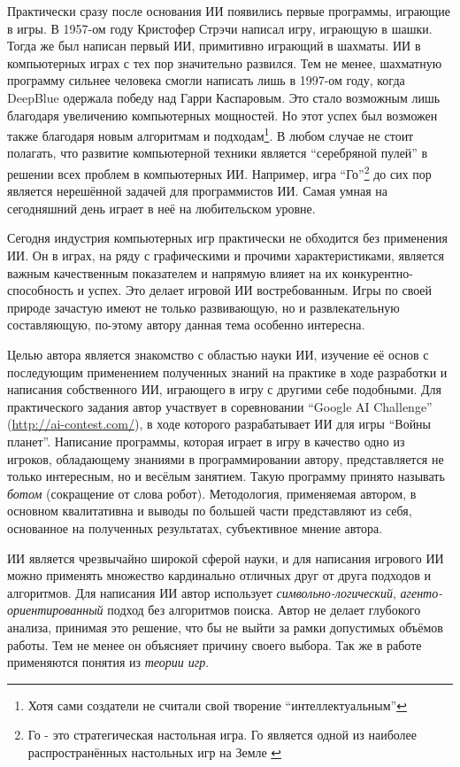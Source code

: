 \documentclass[12pt]{report}
\begin{document}
Практически сразу после основания ИИ появились первые программы, играющие в игры. В 1957-ом году Кристофер Стрэчи написал игру, играющую в шашки. Тогда же был написан первый ИИ, примитивно играющий в шахматы. \citep{russell1995} ИИ в компьютерных играх с тех пор значительно развился. Тем не менее, шахматную программу сильнее человека смогли написать лишь в 1997-ом году, когда DeepBlue одержала победу над Гарри Каспаровым. Это стало возможным лишь благодаря увеличению компьютерных мощностей. Но этот успех был возможен также благодаря новым алгоритмам и подходам\footnote{Хотя сами создатели не считали свой творение ``интеллектуальным''\cite{moravec1998will}}. В любом случае не стоит полагать, что развитие компьютерной техники является ``серебряной пулей'' в решении всех проблем в компьютерных ИИ. Например, игра ``Го''\footnote{Го - это стратегическая настольная игра. Го является одной из наиболее распространённых настольных игр на Земле \cite{GoGameWiki}} до сих пор является нерешённой задачей для программистов ИИ. Самая умная на сегодняшний день играет в неё на любительском уровне. \citep{russell1995}

Сегодня индустрия компьютерных игр практически не обходится без применения ИИ. Он в играх, на ряду с графическими и прочими характеристиками, является важным качественным показателем и напрямую влияет на их конкурентно-способность и успех. Это делает игровой ИИ востребованным. Игры по своей природе зачастую имеют не только развивающую, но и развлекательную составляющую, по-этому автору данная тема особенно интересна.

Целью автора является знакомство с областью науки ИИ, изучение её основ с последующим применением полученных знаний на практике в ходе разработки и написания собственного ИИ, играющего в игру с другими себе подобными. Для практического задания автор участвует в соревновании ``Google AI Challenge'' (\url{http://ai-contest.com/}), в ходе которого разрабатывает ИИ для игры ``Войны планет''. Написание программы, которая играет в игру в качество одно из игроков, обладающему знаниями в программировании автору, представляется не только интересным, но и весёлым занятием. Такую программу принято называть \emph{ботом} (сокращение от слова робот). Методология, применяемая автором, в основном квалитативна и выводы по большей части представляют из себя, основанное на полученных результатах, субъективное мнение автора.

ИИ является чрезвычайно широкой сферой науки, и для написания игрового ИИ можно применять множество кардинально отличных друг от друга подходов и алгоритмов. Для написания ИИ автор использует \emph{символьно-логический}, \emph{агенто-ориентированный} подход без алгоритмов поиска. Автор не делает глубокого анализа, принимая это решение, что бы не выйти за рамки допустимых объёмов работы. Тем не менее он объясняет причину своего выбора. Так же в работе применяются понятия из \emph{теории игр}.
\end{document}
